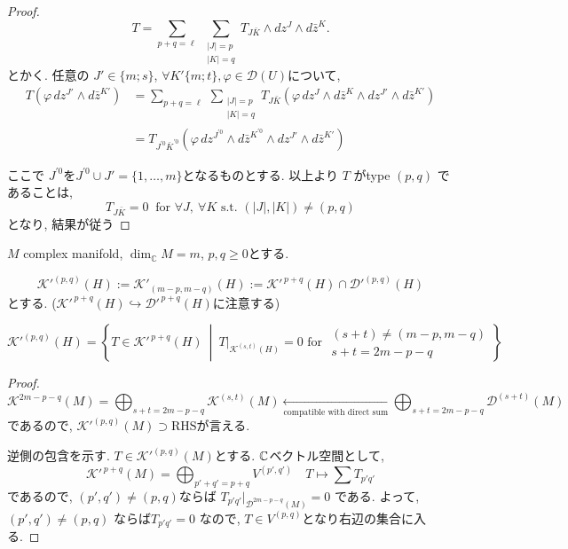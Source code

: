 \begin{proof}
\[
T=\sum_{p+q=\ell}\ \sum_{\substack{|J|=p\\|K|=q}} T_{J\bar{K}}\wedge dz^{J}\wedge d\bar{z}^{K}.
\]
とかく. 
任意の \(J'\in \{m;s\}\), \(\forall K'\{m;t\},  \varphi\in \mathcal{D}(U)\)について, 
\begin{align*}
T(\varphi\,dz^{J'}\wedge d\bar{z}^{K'})
&=
\sum_{p+q=\ell}\ \sum_{\substack{|J|=p\\|K|=q}}
T_{J\bar{K}}(\varphi\,dz^{J}\wedge d\bar{z}^{K}\wedge dz^{J'}\wedge d\bar{z}^{K'})\\
&=
T_{J^{'0}\bar{K}^{'0}}(\varphi\,dz^{J^{'0}}\wedge d\bar{z}^{K^{'0}}\wedge dz^{J'}\wedge d\bar{z}^{K'})
\end{align*}

ここで
\(J^{'0}\)を\(J^{'0}\cup J'=\{1,\dots,m\}\)となるものとする. 
以上より
\(T\) がtype \((p,q)\) であることは, 
\[
T_{J\bar{K}}=0 \ \text{ for } \forall J,\ \forall K
\text{ s.t. } (|J|,|K|)\neq (p,q)
\]
となり, 結果が従う

\end{proof}


\begin{tcolorbox}[mybox]
\begin{defn}
\label{defn-M-4.11}
\(M\) complex manifold, \(\dim_{\mathbb{C}}M=m\), \(p,q\geq 0\)とする. 

\[
\mathcal{K}'^{(p,q)}(H):=\mathcal{K}'_{(m-p,m-q)}(H):=\mathcal{K}'^{\,p+q}(H)\cap \mathcal{D}'^{(p,q)}(H)
\]
とする. ($\mathcal{K}'^{\,p+q}(H)\hookrightarrow \mathcal{D}'^{\,p+q}(H)$に注意する)
\end{defn}
\end{tcolorbox}

\begin{rem}
\label{rem-M-4.12}
\[
\mathcal{K}'^{(p,q)}(H)=\left\{T\in \mathcal{K}'^{\,p+q}(H)\ \middle|\ T|_{\mathcal{K}^{(s,t)}(H)}=0 \text{ for } 
\begin{array}{l}
(s+t)\neq (m-p,m-q) \\
s+t=2m-p-q
\end{array}
\right\}
\]
\begin{proof}
\[
\mathcal{K}^{2m-p-q}(M)=\bigoplus_{s+t=2m-p-q}\mathcal{K}^{(s,t)}(M)
\underset{\text{compatible with direct sum}}{\longleftarrow} \bigoplus_{s+t=2m-p-q}\mathcal{D}^{(s+t)}(M)
\]
であるので, 
\(
\mathcal{K}'^{(p,q)}(M)\supset \mathrm{RHS} \)が言える. 

逆側の包含を示す. 
\(T\in \mathcal{K}'^{(p,q)}(M)\)とする.
$\mathbb{C}$ベクトル空間として,  
$$
\mathcal{K}'^{\,p+q}(M)=\bigoplus_{p'+q'=p+q} V^{(p',q')}
\quad
T \longmapsto \sum T_{p'q'}
$$
であるので, $ (p',q')\neq (p,q)$ならば
$T_{p'q'}\big|_{\mathcal{D}^{2m-p-q}(M)}=0$
である. 
よって, $(p',q')\neq (p,q)$
ならば$T_{p'q'}=0$
なので, $T \in  V^{(p,q)}$となり右辺の集合に入る. 
\end{proof}
\end{rem}




